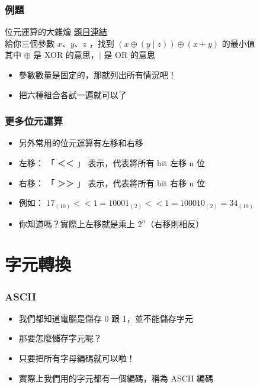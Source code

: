 \documentclass[mathserif]{beamer}
\begin{document}
\begin{frame}
    \frametitle{例題}
    \begin{block}{位元運算的大雜燴}
        \href{https://codeforces.com/group/S6XjkGb6qB/contest/403070/problem/B}{題目連結}\\
        給你三個參數 $x$、$y$、$z$ ，找到 $(x \oplus (y \mid z)) \oplus (x+y)$ 的最小值\\
        其中 $\oplus$ 是 XOR 的意思，$\mid$ 是 OR 的意思
    \end{block}
    \begin{itemize}
        \item<2-> 參數數量是固定的，那就列出所有情況吧！
        \item<2-> 把六種組合各試一遍就可以了
    \end{itemize}
\end{frame}

\begin{frame}
    \frametitle{更多位元運算}
    \begin{itemize}
        \item 另外常用的位元運算有左移和右移
        \vspace{0.5cm}
        \item<2-> 左移： 「 ＜＜ 」 表示，代表將所有 bit 左移 n 位
        \item<2-> 右移： 「 ＞＞ 」 表示，代表將所有 bit 右移 n 位
        \vspace{0.5cm}
        \item<3-> 例如： $17_{(10)} << 1 = 10001_{(2)} << 1 = 100010_{(2)} = 34_{(10)}$
        \item<3->你知道嗎？實際上左移就是乘上 $2^n$（右移則相反）
    \end{itemize}
\end{frame}

\section{字元轉換}

\begin{frame}
    \frametitle{ASCII}
    \begin{itemize}
        \item 我們都知道電腦是儲存 0 跟 1，並不能儲存字元
        \item 那要怎麼儲存字元呢？
        \item<2-> 只要把所有字母編碼就可以啦！
        \item<2-> 實際上我們用的字元都有一個編碼，稱為 ASCII 編碼
    \end{itemize}
\end{frame}
\end{document}
